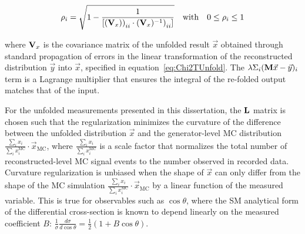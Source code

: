 \begin{refsection}
\begin{linenomath*}
\begin{align}
\rho_{i} = \sqrt{1 - \frac{1}{[{(\mathbf{V}_{x}))}_{ii} \cdot {(\mathbf{V}_{x})^{-1})}_{ii}]}} \quad \text{with} \quad 0 \leq \rho_{i} \leq 1
\end{align}
\end{linenomath*}
where $\mathbf{V}_{x}$ is the covariance matrix of the unfolded result $\vec{x}$ obtained through standard propagation of errors in the linear transformation of the reconstructed distribution $\vec{y}$ into $\vec{x}$, specified in equation~\ref{eq:Chi2TUnfold}.
The $\lambda\Sigma_{i}(\mathbf{M}\vec{x}-\vec{y})_{i}$ term is a Lagrange multiplier that ensures the integral of the re-folded output matches that of the input.

For the unfolded measurements presented in this dissertation, the $\mathbf{L}$ matrix is chosen such that the regularization minimizes the curvature of the difference between the unfolded distribution $\vec{x}$ and the generator-level MC distribution $\frac{\sum_i x_i}{\sum_i x^{\text{MC}}_i} \cdot \vec{x}_{\text{MC}}$, where $\frac{\sum_i x_i}{\sum_i x^{\text{MC}}_i}$ is a scale factor that normalizes the total number of reconstructed-level MC signal events to the number observed in recorded data.
Curvature regularization is unbiased when the shape of $\vec{x}$ can only differ from the shape of the MC simulation $\frac{\sum_i x_i}{\sum_i x^{\text{MC}}_i} \cdot \vec{x}_{\text{MC}}$ by a linear function of the measured variable. 
This is true for observables such as $\cos\theta$, where the SM analytical form of the differential cross-section is known to depend linearly on the measured coefficient $B$: $\tfrac{1}{\sigma}\tfrac{d\sigma}{d\cos\theta} = \tfrac{1}{2} (1+B \cos\theta)$. 


\end{refsection}

